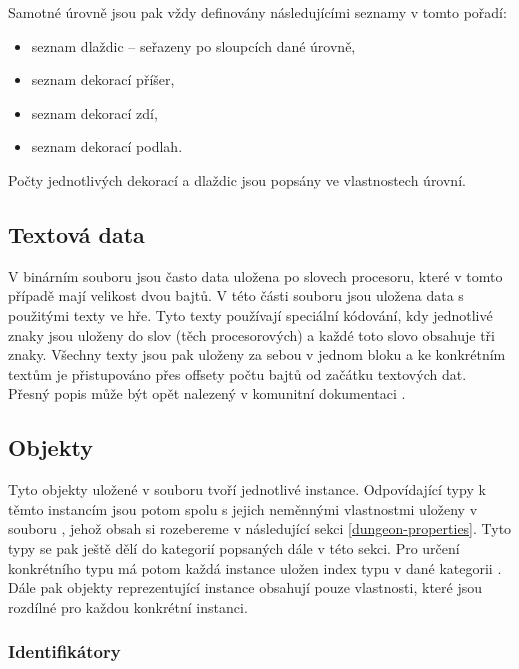 Samotné úrovně jsou pak vždy definovány následujícími seznamy v tomto pořadí:
\begin{itemize}
\item seznam dlaždic -- seřazeny po sloupcích dané úrovně,
\item seznam dekorací příšer,
\item seznam dekorací zdí, 
\item seznam dekorací podlah.
\end{itemize}
Počty jednotlivých dekorací a dlaždic jsou popsány ve vlastnostech úrovní.

\subsection{Textová data}

V binárním souboru jsou často data uložena po slovech procesoru, které v tomto případě mají velikost dvou bajtů. 
V této části souboru jsou uložena data s použitými texty ve hře. Tyto texty používají speciální kódování,
kdy jednotlivé znaky jsou uloženy do slov  (těch procesorových) a každé toto slovo obsahuje tři znaky. Všechny 
texty jsou pak uloženy za sebou v jednom bloku a ke konkrétním textům je přistupováno přes offsety počtu bajtů
od začátku textových dat. Přesný popis může být opět nalezený v komunitní dokumentaci \cite{TechnicalDocumentationFontanel05}.

\subsection{Objekty}

Tyto objekty uložené v souboru  tvoří jednotlivé instance. Odpovídající typy
k těmto instancím jsou potom spolu s jejich neměnnými vlastnostmi uloženy v souboru ,
jehož obsah si rozebereme v následující sekci \ref{dungeon-properties}. Tyto typy se pak ještě dělí do kategorií popsaných dále v této sekci.
Pro určení konkrétního typu má potom každá instance uložen index typu v dané kategorii .
Dále pak objekty reprezentující instance obsahují pouze vlastnosti, které jsou rozdílné pro každou konkrétní instanci.


\subsubsection{Identifikátory}

